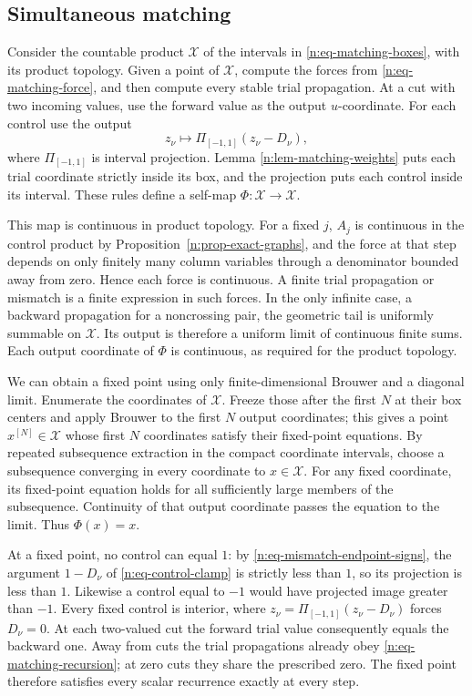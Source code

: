 \subsection{Simultaneous matching}

Consider the countable product \(\mathcal X\) of the intervals in
\eqref{n:eq-matching-boxes}, with its product topology.  Given a point of
\(\mathcal X\), compute the forces from \eqref{n:eq-matching-force}, and
then compute every stable trial propagation.  At a cut with two incoming
values, use the forward value as the output \(u\)-coordinate.  For each
control use the output
\begin{equation}
 z_\nu\longmapsto
 \Pi_{[-1,1]}(z_\nu-D_\nu),
 \label{n:eq-control-clamp}
\end{equation}
where \(\Pi_{[-1,1]}\) is interval projection.  Lemma
\ref{n:lem-matching-weights} puts each trial coordinate strictly inside
its box, and the projection puts each control inside its interval.  These
rules define a self-map \(\Phi:\mathcal X\to\mathcal X\).

This map is continuous in product topology.  For a fixed \(j\), \(A_j\)
is continuous in the control product by Proposition~\ref{n:prop-exact-graphs},
and the force at that step depends on only finitely many column variables
through a denominator bounded away from zero.  Hence each force is
continuous.  A finite trial propagation or mismatch is a finite expression
in such forces.  In the only infinite case, a backward propagation for a
noncrossing pair, the geometric tail is uniformly summable on
\(\mathcal X\).  Its output is therefore a uniform limit of continuous
finite sums.  Each output coordinate of \(\Phi\) is continuous, as
required for the product topology.

We can obtain a fixed point using only finite-dimensional Brouwer and a
diagonal limit.  Enumerate the coordinates of \(\mathcal X\).  Freeze those
after the first \(N\) at their box centers and apply Brouwer to the first
\(N\) output coordinates; this gives a point \(x^{[N]}\in\mathcal X\)
whose first \(N\) coordinates satisfy their fixed-point equations.
By repeated subsequence extraction in the compact coordinate intervals,
choose a subsequence converging in every coordinate to \(x\in\mathcal X\).
For any fixed coordinate, its fixed-point equation holds for all
sufficiently large members of the subsequence.  Continuity of that output
coordinate passes the equation to the limit.  Thus \(\Phi(x)=x\).

At a fixed point, no control can equal \(1\): by
\eqref{n:eq-mismatch-endpoint-signs}, the argument \(1-D_\nu\) of
\eqref{n:eq-control-clamp} is strictly less than \(1\), so its projection
is less than \(1\).  Likewise a control equal to \(-1\) would have projected
image greater than \(-1\).  Every fixed control is interior, where
\(z_\nu=\Pi_{[-1,1]}(z_\nu-D_\nu)\) forces \(D_\nu=0\).
At each two-valued cut the forward trial value consequently equals the
backward one.  Away from cuts the trial propagations already obey
\eqref{n:eq-matching-recursion}; at zero cuts they share the prescribed
zero.  The fixed point therefore satisfies every scalar recurrence
exactly at every step.

